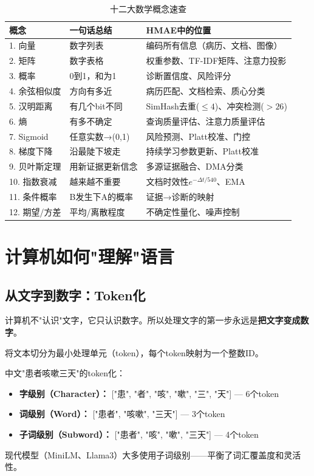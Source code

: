 \documentclass[11pt,a4paper]{ctexart}
\begin{document}
\begin{table}[H]
\centering
\small
\begin{tabular}{lll}
\toprule
\textbf{概念} & \textbf{一句话总结} & \textbf{HMAE中的位置} \\
\midrule
1. 向量 & 数字列表 & 编码所有信息（病历、文档、图像）\\
2. 矩阵 & 数字表格 & 权重参数、TF-IDF矩阵、注意力投影\\
3. 概率 & 0到1，和为1 & 诊断置信度、风险评分\\
4. 余弦相似度 & 方向有多近 & 病历匹配、文档检索、质心分类\\
5. 汉明距离 & 有几个bit不同 & SimHash去重($\leq4$)、冲突检测($>26$)\\
6. 熵 & 有多不确定 & 查询质量评估、注意力质量评估\\
7. Sigmoid & 任意实数→(0,1) & 风险预测、Platt校准、门控\\
8. 梯度下降 & 沿最陡下坡走 & 持续学习参数更新、Platt校准\\
9. 贝叶斯定理 & 用新证据更新信念 & 多源证据融合、DMA分类\\
10. 指数衰减 & 越来越不重要 & 文档时效性$e^{-\Delta t/540}$、EMA\\
11. 条件概率 & B发生下A的概率 & 证据→诊断的映射\\
12. 期望/方差 & 平均/离散程度 & 不确定性量化、噪声控制\\
\bottomrule
\end{tabular}
\caption{十二大数学概念速查}
\end{table}

\newpage

\section{计算机如何"理解"语言}

\subsection{从文字到数字：Token化}

计算机不"认识"文字，它只认识数字。所以处理文字的第一步永远是\textbf{把文字变成数字}。

\begin{defbox}
将文本切分为最小处理单元（token），每个token映射为一个整数ID。
\end{defbox}

\begin{exambox}[Token化的三种粒度]
中文"患者咳嗽三天"的token化：
\begin{itemize}[nosep]
\item \textbf{字级别（Character）：} ["患", "者", "咳", "嗽", "三", "天"] — 6个token
\item \textbf{词级别（Word）：} ["患者", "咳嗽", "三天"] — 3个token
\item \textbf{子词级别（Subword）：} ["患者", "咳", "嗽", "三天"] — 4个token
\end{itemize}
现代模型（MiniLM、Llama3）大多使用子词级别——平衡了词汇覆盖度和灵活性。
\end{exambox}
\end{document}
